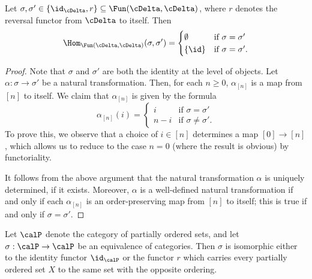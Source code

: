 \begin{lemma}\label{calcul}
Let $\sigma, \sigma' \in \{ \id_{\cDelta}, r \} \subseteq \Fun( \cDelta, \cDelta)$, where
$r$ denotes the reversal functor from $\cDelta$ to itself. Then
$$ \Hom_{ \Fun(\cDelta, \cDelta)}(\sigma, \sigma') = \begin{cases} \emptyset & \text{if } \sigma= \sigma' \\
\{ \id \} & \text{if } \sigma = \sigma'. \end{cases}$$
\end{lemma}

\begin{proof}
Note that $\sigma$ and $\sigma'$ are both the identity at the level of objects. 
Let $\alpha: \sigma \rightarrow \sigma'$ be a natural transformation. Then, for each $n \geq 0$,
$\alpha_{[n]}$ is a map from $[n]$ to itself. We claim that $\alpha_{[n]}$ is given by the formula
$$ \alpha_{[n]}(i) = \begin{cases} i & \text{if } \sigma = \sigma' \\
n-i & \text{if } \sigma \neq \sigma'.\end{cases}$$
To prove this, we observe that a choice of $i \in [n]$ determines a map $[0] \rightarrow [n]$, which allows us to reduce to the case $n=0$ (where the result is obvious) by functoriality.

It follows from the above argument that the natural transformation $\alpha$ is uniquely determined, if it exists. Moreover, $\alpha$ is a well-defined natural transformation if and only if each $\alpha_{[n]}$ is an order-preserving map from $[n]$ to itself; this is true if and only if $\sigma = \sigma'$.
\end{proof}

\begin{proposition}\label{cape}
Let $\calP$ denote the category of partially ordered sets, and let
$\sigma: \calP \rightarrow \calP$ be an equivalence of categories. Then
$\sigma$ is isomorphic either to the identity functor $\id_{\calP}$ or the functor
$r$ which carries every partially ordered set $X$ to the same set with the opposite ordering.
\end{proposition}


